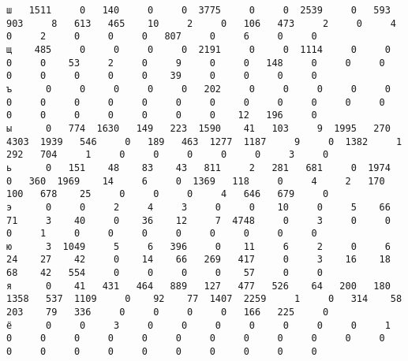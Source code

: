 \documentclass{article}
\begin{document}
\begin{addmargin}{-4em}
\begin{verbatim}
ш   1511     0   140     0     0  3775     0     0  2539     0   593   903     8   613   465    10     2     0   106   473     2     0     4     0     2     0     0     0   807     0     6     0     0
щ    485     0     0     0     0  2191     0     0  1114     0     0     0     0    53     2     0     9     0     0   148     0     0     0     0     0     0     0     0    39     0     0     0     0
ъ      0     0     0     0     0   202     0     0     0     0     0     0     0     0     0     0     0     0     0     0     0     0     0     0     0     0     0     0     0     0    12   196     0
ы      0   774  1630   149   223  1590    41   103     9  1995   270  4303  1939   546     0   189   463  1277  1187     9     0  1382     1   292   704     1     0     0     0     0     0     3     0
ь      0   151    48    83    43   811     2   281   681     0  1974     0   360  1969    14     6     0  1369   118     0     4     2   170   100   678    25     0     0     0     4   646   679     0
э      0     0     2     4     3     0     0    10     0     5    66    71     3    40     0    36    12     7  4748     0     3     0     0     0     1     0     0     0     0     0     0     0     0
ю      3  1049     5     6   396     0    11     6     2     0     6    24    27    42     0    14    66   269   417     0     3    16    18    68    42   554     0     0     0     0    57     0     0
я      0    41   431   464   889   127   477   526    64   200   180  1358   537  1109     0    92    77  1407  2259     1     0   314    58   203    79   336     0     0     0     0   166   225     0
ё      0     0     3     0     0     0     0     0     0     0     1     0     0     0     0     0     0     0     0     0     0     0     0     0     0     0     0     0     0     0     0     0     0
 \end{verbatim}
\end{addmargin}
\end{document}
